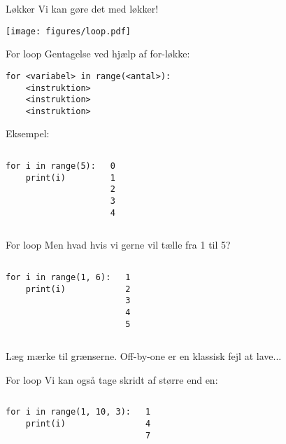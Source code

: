 \begin{frame}[fragile]{Løkker}
	Vi kan gøre det med løkker!
	\begin{center}
		\texttt{[image: figures/loop.pdf]}
	\end{center}
\end{frame}


\begin{frame}[fragile]{For loop}
	Gentagelse ved hjælp af for-løkke:
	\begin{lstlisting}[style=python]
for <variabel> in range(<antal>):
	<instruktion>
	<instruktion>
	<instruktion>
	\end{lstlisting}
	\pause
	Eksempel:
	\begin{columns}
		\begin{lstlisting}[style=python]
for i in range(5):
	print(i)
		\end{lstlisting}
		\begin{lstlisting}[style=python]
0
1
2
3
4
		\end{lstlisting}
	\end{columns}
\end{frame}


\begin{frame}[fragile]{For loop}
	Men hvad hvis vi gerne vil tælle fra 1 til 5?
	\pause
	\begin{columns}
		\column{0.4\textwidth}
		\begin{lstlisting}[style=python]
for i in range(1, 6):
	print(i)
		\end{lstlisting}
		\column{0.4\textwidth}
				\begin{lstlisting}[style=python]
1
2
3
4
5
		\end{lstlisting}
	\end{columns}
	Læg mærke til grænserne. Off-by-one er en klassisk fejl at lave...
\end{frame}

\begin{frame}[fragile]{For loop}
	Vi kan også tage skridt af større end en:
	\begin{columns}
		\begin{lstlisting}[style=python]
for i in range(1, 10, 3):
	print(i)
		\end{lstlisting}
				\begin{lstlisting}[style=python]
1
4
7
		\end{lstlisting}
	\end{columns}
\end{frame}


